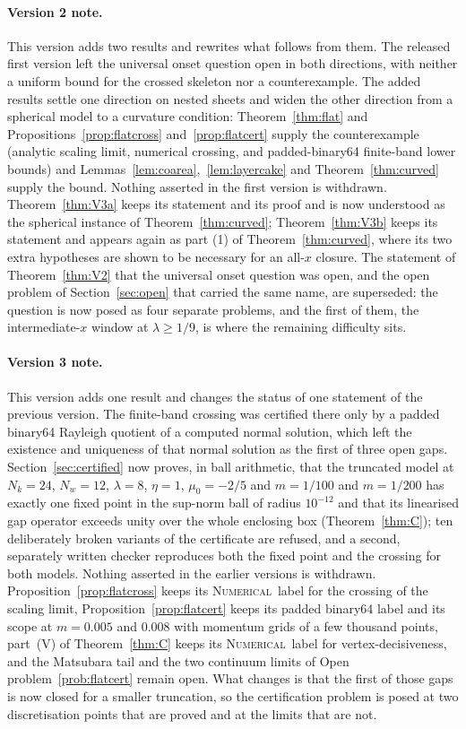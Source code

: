 \documentclass[11pt]{article}
\newcommand{\NUM}{\upshape\mdseries\textsc{Numerical}}
\theoremstyle{definition}
\theoremstyle{remark}
\begin{document}
\paragraph{Version 2 note.} This version adds two results and rewrites what follows from them. The released first version left the universal onset question open in both directions, with neither a uniform bound for the crossed skeleton nor a counterexample. The added results settle one direction on nested sheets and widen the other direction from a spherical model to a curvature condition: Theorem~\ref{thm:flat} and Propositions~\ref{prop:flatcross} and~\ref{prop:flatcert} supply the counterexample (analytic scaling limit, numerical crossing, and padded-binary64 finite-band lower bounds) and Lemmas~\ref{lem:coarea},~\ref{lem:layercake} and Theorem~\ref{thm:curved} supply the bound. Nothing asserted in the first version is withdrawn. Theorem~\ref{thm:V3a} keeps its statement and its proof and is now understood as the spherical instance of Theorem~\ref{thm:curved}; Theorem~\ref{thm:V3b} keeps its statement and appears again as part (1) of Theorem~\ref{thm:curved}, where its two extra hypotheses are shown to be necessary for an all-$x$ closure. The statement of Theorem~\ref{thm:V2} that the universal onset question was open, and the open problem of Section~\ref{sec:open} that carried the same name, are superseded: the question is now posed as four separate problems, and the first of them, the intermediate-$x$ window at $\lambda\ge1/9$, is where the remaining difficulty sits.

\paragraph{Version 3 note.} This version adds one result and changes the status of one statement of the previous version. The finite-band crossing was certified there only by a padded binary64 Rayleigh quotient of a computed normal solution, which left the existence and uniqueness of that normal solution as the first of three open gaps. Section~\ref{sec:certified} now proves, in ball arithmetic, that the truncated model at $N_k=24$, $N_w=12$, $\lambda=8$, $\eta=1$, $\mu_0=-2/5$ and $m=1/100$ and $m=1/200$ has exactly one fixed point in the sup-norm ball of radius $10^{-12}$ and that its linearised gap operator exceeds unity over the whole enclosing box (Theorem~\ref{thm:C}); ten deliberately broken variants of the certificate are refused, and a second, separately written checker reproduces both the fixed point and the crossing for both models. Nothing asserted in the earlier versions is withdrawn. Proposition~\ref{prop:flatcross} keeps its \NUM\ label for the crossing of the scaling limit, Proposition~\ref{prop:flatcert} keeps its padded binary64 label and its scope at $m=0.005$ and $0.008$ with momentum grids of a few thousand points, part~(V) of Theorem~\ref{thm:C} keeps its \NUM\ label for vertex-decisiveness, and the Matsubara tail and the two continuum limits of Open problem~\ref{prob:flatcert} remain open. What changes is that the first of those gaps is now closed for a smaller truncation, so the certification problem is posed at two discretisation points that are proved and at the limits that are not.
\end{document}
